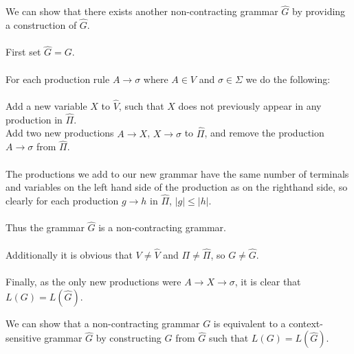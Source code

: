 \documentclass{assignment}
\begin{document}
\begin{problemlist}

  \pbitem
  \begin{problem}
  \end{problem}
  \begin{answer}
    
    We can show that there exists another non-contracting grammar $\hat{G}$ by providing a construction of $\hat{G}$.\\\\    
    First set $\hat{G} = G$.\\\\    
    For each production rule $A \rightarrow \sigma$ where $A \in V$ and $\sigma \in \Sigma$ we do the following:\\\\
    Add a new variable $X$ to $\hat{V}$, such that $X$ does not previously appear in any production in $\hat{\Pi}$.\\
    Add two new productions $A\rightarrow X$, $X\rightarrow \sigma$ to $\hat{\Pi}$, and remove the production $A\rightarrow \sigma$ from $\hat{\Pi}$.\\\\
    The productions we add to our new grammar have the same number of terminals and variables on the left hand side of the production as on the righthand side, so clearly for each production $g\rightarrow h$ in $\hat{\Pi}$, $|g|\le |h|$.\\\\
    Thus the grammar $\hat{G}$ is a non-contracting grammar.\\\\
    Additionally it is obvious that $V\neq \hat{V}$ and $\Pi \neq \hat{\Pi}$, so $G \neq \hat{G}$.\\\\
    Finally, as the only new productions were $A\rightarrow X \rightarrow \sigma$, it is clear that $L(G) = L(\hat{G})$.
  \end{answer}

  \pbitem
  \begin{problem}
  \end{problem}
  \begin{answer}
    
    We can show that a non-contracting grammar $G$ is equivalent to a context-sensitive grammar $\hat{G}$ by constructing $G$ from $\hat{G}$ such that $L(G) = L(\hat{G})$.
    
    \bigskip   
    

\end{answer}
\end{problemlist}
\end{document}
